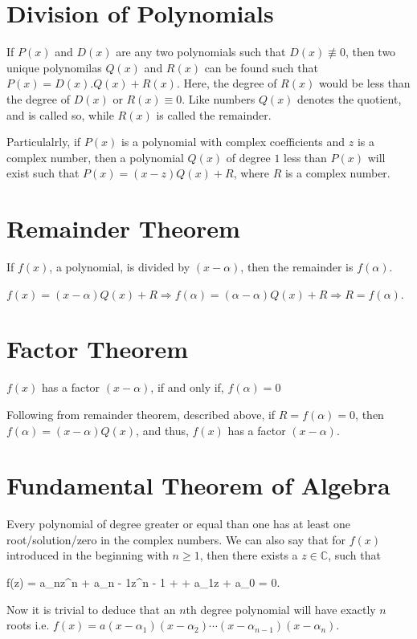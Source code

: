 \section{Division of Polynomials}
If $P(x)$ and $D(x)$ are any two polynomials such that $D(x)\nequiv 0$, then two unique polynomilas $Q(x)$
and $R(x)$ can be found such that $P(x) = D(x).Q(x) + R(x)$. Here, the degree of $R(x)$ would be less than
the degree of $D(x)$ or $R(x)\equiv 0$. Like numbers $Q(x)$ denotes the quotient, and is called so, while
$R(x)$ is called the remainder.

Particulalrly, if $P(x)$ is a polynomial with complex coefficients and $z$ is a complex number, then a
polynomial $Q(x)$ of degree $1$ less than $P(x)$ will exist such that $P(x) = (x - z)Q(x) + R$, where $R$ is
a complex number.

\section{Remainder Theorem}
\starttheorem
  If $f(x)$, a polynomial, is divided by $(x - \alpha)$, then the remainder is $f(\alpha)$.
\stoptheorem

\startproof
  $f(x) = (x - \alpha)Q(x) + R\Rightarrow f(\alpha) = (\alpha - \alpha)Q(x) + R \Rightarrow R = f(\alpha)$.
\stopproof

\section{Factor Theorem}
\starttheorem
  $f(x)$ has a factor $(x - \alpha)$, if and only if, $f(\alpha) = 0$
\stoptheorem

\startproof
  Following from remainder theorem, described above, if $R = f(\alpha) = 0$, then $f(\alpha) = (x -
  \alpha)Q(x)$, and thus, $f(x)$ has a factor $(x - \alpha)$.
\stopproof

\section{Fundamental Theorem of Algebra}
Every polynomial of degree greater or equal than one has at least one root/solution/zero in the complex
numbers. We can also say that for $f(x)$ introduced in the beginning with $n\geq 1$, then there exists a
$z\in\mathbb{C}$, such that

\startformula f(z) = a_nz^n + a_{n - 1}z^{n - 1} + \cdots + a_1z + a_0 = 0.\stopformula

Now it is trivial to deduce that an $n$th degree polynomial will have exactly $n$ roots i.e. $f(x) = a(x -
\alpha_1)(x - \alpha_2)\cdots(x - \alpha_{n - 1})(x - \alpha_n)$.

